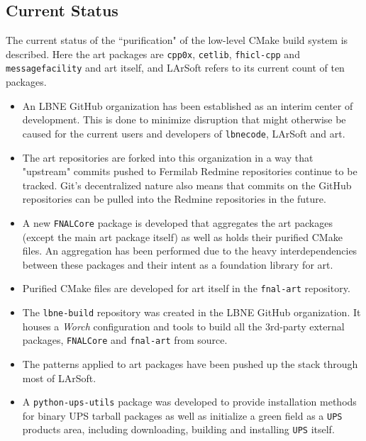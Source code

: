 \documentclass[usletter]{article}
\newcommand{\code}[1]{\texttt{#1}}
\newcommand{\worch}{\textit{Worch}\xspace}
\newcommand{\ups}{\code{UPS}\xspace}
\newcommand{\art}{art\xspace}
\newcommand{\larsoft}{LArSoft\xspace}
\newcommand{\lbnecode}{\code{lbnecode}\xspace}
\begin{document}
\subsection{Current Status}
The current status of the ``purification" of the low-level CMake build
system is described. Here the \art packages are \code{cpp0x}, \code{cetlib},
\code{fhicl-cpp} and \code{messagefacility} and \art itself, and \larsoft refers to
its current count of ten packages.
\begin{itemize}

\item An LBNE GitHub organization\cite{lbneghorg} has been established
  as an interim center of development.  This is done to minimize
  disruption that might otherwise be caused for the current users and
  developers of \lbnecode, \larsoft and \art.

\item The \art repositories are forked into this organization in a way
  that "upstream" commits pushed to Fermilab Redmine repositories
  continue to be tracked. Git's decentralized nature also means that
  commits on the GitHub repositories can be pulled into the Redmine
  repositories in the future.
  
\item A new \code{FNALCore} package\cite{fnalcoregh} is developed that
  aggregates the \art packages (except the main \art package itself)
  as well as holds their purified CMake files. An aggregation has been
  performed due to the heavy interdependencies between these packages
  and their intent as a foundation library for \art.

\item Purified CMake files are developed for \art itself in the
  \code{fnal-art} repository\cite{fnalartgh}.

\item The \code{lbne-build} repository\cite{lbnebuildgh} was created
  in the LBNE GitHub organization. It houses a \worch configuration
  and tools to build all the 3rd-party external packages,
  \code{FNALCore} and \code{fnal-art} from source.

\item The patterns applied to \art packages have been pushed up the
  stack through most of \larsoft.

\item A \code{python-ups-utils} package\cite{urman} was developed to
  provide installation methods for binary UPS tarball packages as well
  as initialize a green field as a \ups products area, including
  downloading, building and installing \ups itself.


\end{itemize}
\end{document}
